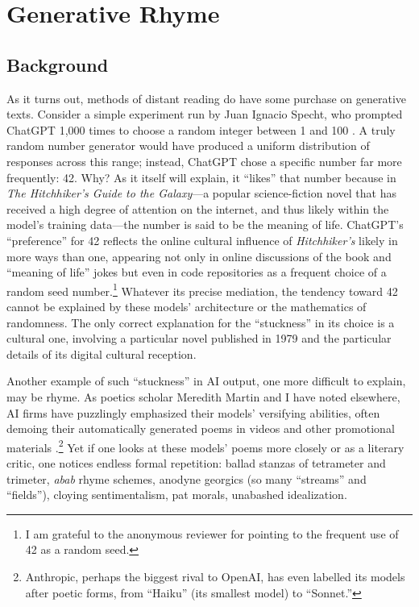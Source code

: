 \documentclass{simple-humanities}         %
\begin{document}
\section{Generative Rhyme}\label{generative-rhyme}

\subsection{Background}

As it turns out, methods of distant reading do have some purchase on generative texts.
Consider a simple experiment run by Juan Ignacio Specht, who prompted ChatGPT 1,000 times to choose a random integer between 1 and 100 \parencite{spechtGPTAnswerLife2023}.
A truly random number generator would have produced a uniform distribution of responses across this range; instead, ChatGPT chose a specific number far more frequently: 42.
Why?
As it itself will explain, it ``likes'' that number because in \emph{The Hitchhiker's Guide to the Galaxy}---a popular science-fiction novel that has received a high degree of attention on the internet, and thus likely within the model's training data---the number is said to be the meaning of life.
ChatGPT's ``preference'' for 42 reflects the online cultural influence of \emph{Hitchhiker's} likely in more ways than one, appearing not only in online discussions of the book and ``meaning of life'' jokes but even in code repositories as a frequent choice of a random seed number.\footnote{I am grateful to the anonymous reviewer for pointing to the frequent use of 42 as a random seed.}
Whatever its precise mediation, the tendency toward 42 cannot be explained by these models' architecture or the mathematics of randomness.
The only correct explanation for the ``stuckness'' in its choice is a cultural one, involving a particular novel published in 1979 and the particular details of its digital cultural reception.

Another example of such ``stuckness'' in AI output, one more difficult to explain, may be rhyme.
As poetics scholar Meredith Martin and I have noted elsewhere, AI firms have puzzlingly emphasized their models' versifying abilities, often demoing their automatically generated poems in videos and other promotional materials \parencite{heuserHistoricalProsodyMechanical2024}.\footnote{Anthropic, perhaps the biggest rival to OpenAI, has even labelled its models after poetic forms, from ``Haiku'' (its smallest model) to ``Sonnet.''}
Yet if one looks at these models' poems more closely or as a literary critic, one notices endless formal repetition: ballad stanzas of tetrameter and trimeter, \emph{abab} rhyme schemes, anodyne georgics (so many ``streams'' and ``fields''), cloying sentimentalism, pat morals, unabashed idealization.
\end{document}
